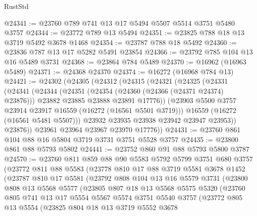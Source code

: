 \begin{lexlean}{RustStd}
\begin{coremodule}
@24341 := @23760 @789 @741 @13 @17 @5494 @5507 @5514 @3751 @5480 @3757
@24344 := @23772 @789 @13 @5494
@24351 := @23825 @788 @18 @13 @3719 @5492 @3678 @1468
@24354 := @23787 @788 @18 @5492
@24360 := @23836 @787 @13 @17 @5282 @5491 @23854
@24366 := @23792 @785 @104 @13 @16 @5489 @3731
@24368 := @23864 @784 @5489
@24370 := @16962 (@16963 @5489)
@24371 := @24368 @24370
@24374 := @16272 (@16968 @784 @13)
@24421 := @24302
    (@24305
      (@24312
        (@24315
          (@24321
            (@24325
              (@24331
                (@24341
                  (@24344
                    (@24351
                      (@24354 (@24360 (@24366 (@24371 @24374) @23876)))
                      @23882
                      @23885
                      @23888
                      @23891
                      @17776))
                  (@23903 @5500 @3757 @23914 @23917 @16559 (@16272 (@16561 @5501 @3719)))
                  @16559
                  (@16272 (@16561 @5481 @5507)))
                @23932
                @23935
                @23938
                @23942
                @23947
                @23953))
            @23876))
        @23961
        @23964
        @23967
        @23970
        @17776))
@24431 := @23760 @861 @104 @88 @16 @5804 @3719 @3731 @3751 @5528 @3757
@24435 := @23800 @861 @88 @5793 @5802
@24441 := @23752 @860 @91 @88 @5793 @5800 @3787
@24570 := @23760
    @811
    @859
    @88
    @90
    @5583
    @5792
    @5799
    @3751
    @680
    @3757
    (@23772
      @811
      @88
      @5583
      (@23778
        @810
        @17
        @88
        @3719
        @5581
        @3678
        @1452
        (@23787
          @810
          @17
          @5581
          (@23792
            @808
            @104
            @13
            @16
            @5579
            @3731
            (@23800
              @808
              @13
              @5568
              @5577
              (@23805
                @807
                @18
                @13
                @5568
                @5575
                @5320
                (@23760
                  @805
                  @741
                  @13
                  @17
                  @5554
                  @5567
                  @5574
                  @3751
                  @5540
                  @3757
                  (@23772
                    @805
                    @13
                    @5554
                    (@23825
                      @804
                      @18
                      @13
                      @3719
                      @5552
                      @3678

\end{coremodule}
\end{lexlean}
